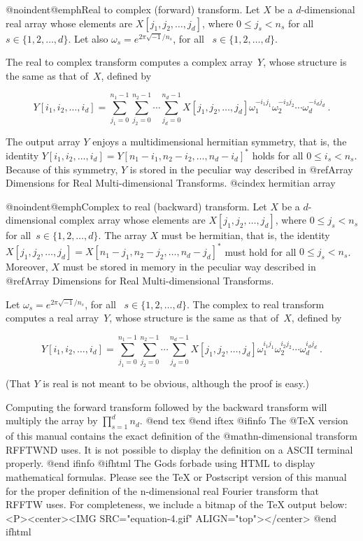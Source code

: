 @noindent@emph{Real to complex (forward) transform.}
Let $X$ be a $d$-dimensional real array whose elements are $X[j_1, j_2,
\ldots, j_d]$, where $0 \leq j_s < n_s$ for all~$s \in \{ 1, 2, \ldots,
d \}$.  Let also $\omega_s = e^{2\pi \sqrt{-1}/n_s}$, for all ~$s \in \{
1, 2, \ldots, d \}$.

The real to complex transform computes a complex array~$Y$, whose
structure is the same as that of~$X$, defined by

$$
Y[i_1, i_2, \ldots, i_d] =
    \sum_{j_1 = 0}^{n_1 - 1}
        \sum_{j_2 = 0}^{n_2 - 1}
           \cdots
              \sum_{j_d = 0}^{n_d - 1}
                  X[j_1, j_2, \ldots, j_d] 
                      \omega_1^{-i_1 j_1}
                      \omega_2^{-i_2 j_2}
                      \cdots
                      \omega_d^{-i_d j_d} \ .
$$

The output array $Y$ enjoys a multidimensional hermitian symmetry, that
is, the identity $Y[i_1, i_2, \ldots, i_d] = Y[n_1-i_1, n_2-i_2, \ldots,
n_d - i_d]^{*}$ holds for all $0 \leq i_s < n_s$.  Because of this
symmetry, $Y$ is stored in the peculiar way described in @ref{Array
Dimensions for Real Multi-dimensional Transforms}.
@cindex hermitian array

@noindent@emph{Complex to real (backward) transform.}  Let $X$ be a
$d$-dimensional complex array whose elements are $X[j_1, j_2, \ldots,
j_d]$, where $0 \leq j_s < n_s$ for all~$s \in \{ 1, 2, \ldots, d \}$.
The array $X$ must be hermitian, that is, the identity $X[j_1, j_2,
\ldots, j_d] = X[n_1-j_1, n_2-j_2, \ldots, n_d - j_d]^{*}$ must hold for all
$0 \leq j_s < n_s$.  Moreover, $X$ must be stored in memory in the
peculiar way described in @ref{Array Dimensions for Real
Multi-dimensional Transforms}.

Let $\omega_s = e^{2\pi \sqrt{-1}/n_s}$, for all ~$s \in \{ 1, 2,
\ldots, d \}$.  The complex to real transform computes a real array~$Y$, whose
structure is the same as that of~$X$, defined by

$$
Y[i_1, i_2, \ldots, i_d] =
    \sum_{j_1 = 0}^{n_1 - 1}
        \sum_{j_2 = 0}^{n_2 - 1}
           \cdots
              \sum_{j_d = 0}^{n_d - 1}
                  X[j_1, j_2, \ldots, j_d] 
                      \omega_1^{i_1 j_1}
                      \omega_2^{i_2 j_2}
                      \cdots
                      \omega_d^{i_d j_d} \ .
$$

(That $Y$ is real is not meant to be obvious, although the proof is
easy.)

Computing the forward transform followed by the backward transform
will multiply the array by $\prod_{s=1}^{d} n_d$.
@end tex
@end iftex
@ifinfo
The @TeX{} version of this manual contains the exact definition of the
@math{n}-dimensional transform RFFTWND uses.  It is not possible to
display the definition on a ASCII terminal properly.
@end ifinfo
@ifhtml
The Gods forbade using HTML to display mathematical formulas.  Please
see the TeX or Postscript version of this manual for the proper
definition of the n-dimensional real Fourier transform that RFFTW
uses.  For completeness, we include a bitmap of the TeX output below:
<P><center><IMG SRC="equation-4.gif" ALIGN="top"></center>
@end ifhtml


